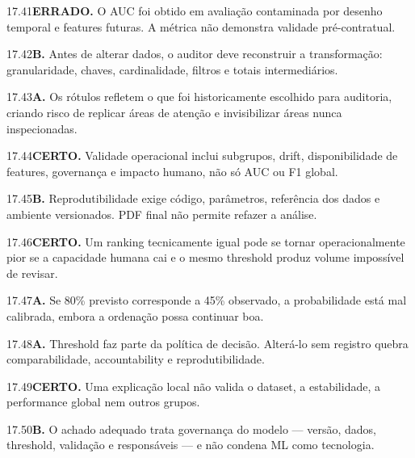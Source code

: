 \begin{solucao}{17.41}\textbf{ERRADO.} O AUC foi obtido em avaliação contaminada por desenho temporal e features futuras. A métrica não demonstra validade pré-contratual.\end{solucao}
\begin{solucao}{17.42}\textbf{B.} Antes de alterar dados, o auditor deve reconstruir a transformação: granularidade, chaves, cardinalidade, filtros e totais intermediários.\end{solucao}
\begin{solucao}{17.43}\textbf{A.} Os rótulos refletem o que foi historicamente escolhido para auditoria, criando risco de replicar áreas de atenção e invisibilizar áreas nunca inspecionadas.\end{solucao}
\begin{solucao}{17.44}\textbf{CERTO.} Validade operacional inclui subgrupos, drift, disponibilidade de features, governança e impacto humano, não só AUC ou F1 global.\end{solucao}
\begin{solucao}{17.45}\textbf{B.} Reprodutibilidade exige código, parâmetros, referência dos dados e ambiente versionados. PDF final não permite refazer a análise.\end{solucao}
\begin{solucao}{17.46}\textbf{CERTO.} Um ranking tecnicamente igual pode se tornar operacionalmente pior se a capacidade humana cai e o mesmo threshold produz volume impossível de revisar.\end{solucao}
\begin{solucao}{17.47}\textbf{A.} Se 80\% previsto corresponde a 45\% observado, a probabilidade está mal calibrada, embora a ordenação possa continuar boa.\end{solucao}
\begin{solucao}{17.48}\textbf{A.} Threshold faz parte da política de decisão. Alterá-lo sem registro quebra comparabilidade, accountability e reprodutibilidade.\end{solucao}
\begin{solucao}{17.49}\textbf{CERTO.} Uma explicação local não valida o dataset, a estabilidade, a performance global nem outros grupos.\end{solucao}
\begin{solucao}{17.50}\textbf{B.} O achado adequado trata governança do modelo — versão, dados, threshold, validação e responsáveis — e não condena ML como tecnologia.\end{solucao}
